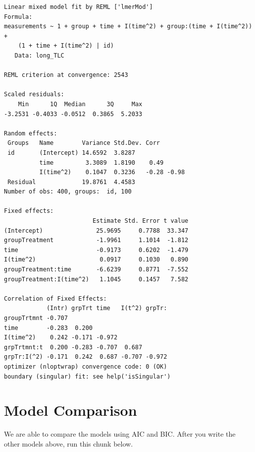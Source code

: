 \documentclass[
  letterpaper,
  DIV=11,
  numbers=noendperiod]{scrreprt}
\begin{document}
\begin{verbatim}
Linear mixed model fit by REML ['lmerMod']
Formula: 
measurements ~ 1 + group + time + I(time^2) + group:(time + I(time^2)) +  
    (1 + time + I(time^2) | id)
   Data: long_TLC

REML criterion at convergence: 2543

Scaled residuals: 
    Min      1Q  Median      3Q     Max 
-3.2531 -0.4033 -0.0512  0.3865  5.2033 

Random effects:
 Groups   Name        Variance Std.Dev. Corr       
 id       (Intercept) 14.6592  3.8287              
          time         3.3089  1.8190    0.49      
          I(time^2)    0.1047  0.3236   -0.28 -0.98
 Residual             19.8761  4.4583              
Number of obs: 400, groups:  id, 100

Fixed effects:
                         Estimate Std. Error t value
(Intercept)               25.9695     0.7788  33.347
groupTreatment            -1.9961     1.1014  -1.812
time                      -0.9173     0.6202  -1.479
I(time^2)                  0.0917     0.1030   0.890
groupTreatment:time       -6.6239     0.8771  -7.552
groupTreatment:I(time^2)   1.1045     0.1457   7.582

Correlation of Fixed Effects:
            (Intr) grpTrt time   I(t^2) grpTr:
groupTrtmnt -0.707                            
time        -0.283  0.200                     
I(time^2)    0.242 -0.171 -0.972              
grpTrtmnt:t  0.200 -0.283 -0.707  0.687       
grpTr:I(^2) -0.171  0.242  0.687 -0.707 -0.972
optimizer (nloptwrap) convergence code: 0 (OK)
boundary (singular) fit: see help('isSingular')
\end{verbatim}

\hypertarget{model-comparison}{%
\section{Model Comparison}\label{model-comparison}}

We are able to compare the models using AIC and BIC. After you write the
other models above, run this chunk below.
\end{document}
